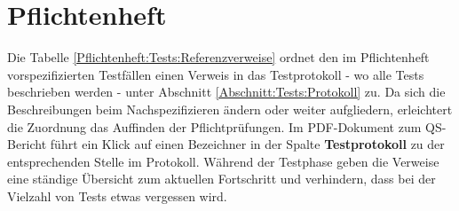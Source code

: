 %



\newpage



\section{Pflichtenheft}
\label{Abschnitt:Tests:Protokoll:Pflichtenheft-Verweise}

Die Tabelle \ref{Pflichtenheft:Tests:Referenzverweise} ordnet den im Pflichtenheft vorspezifizierten Testfällen einen Verweis in das Testprotokoll - wo alle Tests beschrieben werden - unter Abschnitt \ref{Abschnitt:Tests:Protokoll} zu. Da sich die Beschreibungen beim Nachspezifizieren ändern oder weiter aufgliedern, erleichtert die Zuordnung das Auffinden der Pflichtprüfungen. Im PDF-Dokument zum QS-Bericht führt ein Klick auf einen Bezeichner in der Spalte \textbf{Testprotokoll}  zu der entsprechenden Stelle im Protokoll. Während  der Testphase geben die Verweise eine ständige Übersicht zum aktuellen Fortschritt und verhindern, dass bei der Vielzahl von Tests etwas vergessen wird.\\

 

